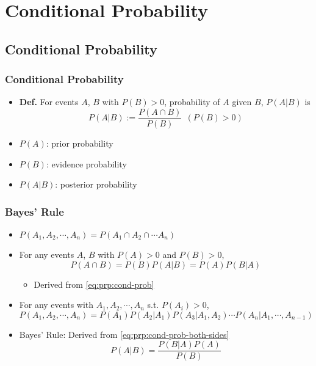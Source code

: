 \section{Conditional Probability}

\subsection{Conditional Probability}

\subsubsection*{Conditional Probability}
\begin{itemize}
    \item \textbf{Def.} For events $A$, $B$ with $P(B)>0$, probability of $A$ given $B$, $P(A|B)$ is
    \begin{equation}\label{eq:prp:cond-prob}
        P(A|B):=\frac{P(A\cap B)}{P(B)}~~(P(B)>0)
    \end{equation}
    \item $P(A)$: prior probability
    \item $P(B)$: evidence probability
    \item $P(A|B)$: posterior probability
\end{itemize}

\subsubsection*{Bayes' Rule}
\begin{itemize}
    \item $P(A_1,A_2,\cdots,A_n)=P(A_1\cap A_2\cap\cdots A_n)$
    \item For any events $A$, $B$ with $P(A)>0$ and $P(B)>0$,
    \begin{equation}\label{eq:prp:cond-prob-both-sides}
        P(A\cap B)=P(B)P(A|B)=P(A)P(B|A)
    \end{equation}
    \begin{itemize}
        \item Derived from \ref{eq:prp:cond-prob}
    \end{itemize}
    \item For any events with $A_1,A_2,\cdots,A_n$ s.t. $P(A_i)>0$,
    \begin{equation}
        P(A_1,A_2,\cdots,A_n)=P(A_1)P(A_2|A_1)P(A_3|A_1,A_2)\cdots P(A_n|A_1,\cdots,A_{n-1})
    \end{equation}
    \item Bayes' Rule: Derived from \ref{eq:prp:cond-prob-both-sides}
    \begin{equation}\label{eq:prp:bayes-rule}
        P(A|B)=\frac{P(B|A)P(A)}{P(B)}
    \end{equation}
\end{itemize}

